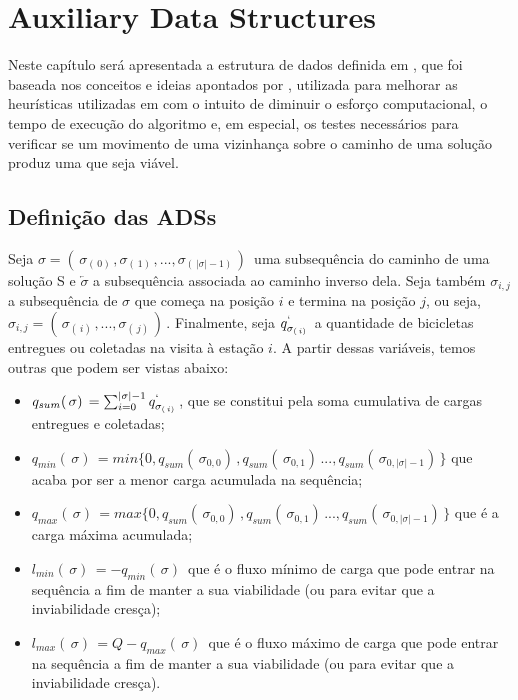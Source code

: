 \chapter{Auxiliary Data Structures}\label{chp:LABEL_CHP_4}
\par Neste capítulo será apresentada a estrutura de dados definida em \citet{art:REF_ART_4}, que foi baseada nos conceitos e ideias apontados por \citet{art:REF_ART_3}, utilizada para melhorar as heurísticas utilizadas em \citet{art:REF_ART_1} com o intuito de diminuir o esforço computacional, o tempo de execução do algoritmo e, em especial, os testes necessários para verificar se um movimento de uma vizinhança sobre o caminho de uma solução produz uma que seja viável.

\section{Definição das ADSs}\label{sec:LABEL_CHP_4_SEC_A}
\par Seja $\sigma = (\, \sigma_{(\,0)\,}, \sigma_{(\,1)\,}, ..., \sigma_{(\,|\sigma| - 1)\,})\,$ uma subsequência do caminho de uma solução S e $\overleftarrow{\sigma}$ a subsequência associada ao caminho inverso dela. Seja também $\sigma_{i, j}$ a subsequência de $\sigma$ que começa na posição $i$ e termina na posição $j$, ou seja, $\sigma_{i, j} = (\, \sigma_{(\,i)\,}, ..., \sigma_{(\,j)\,})\,$. Finalmente, seja $q^{\lq}_{\sigma_{(\,i)\,}}$ a quantidade de bicicletas entregues ou coletadas na visita à estação $i$. A partir dessas variáveis, temos outras que podem ser vistas abaixo:

    \begin{itemize}
        \item $q_{sum}(\,\sigma)\, = \sum^{|\sigma|-1}_{i=0}q^{\lq}_{\sigma_{(\,i)\,}}$, que se constitui pela soma cumulativa de cargas entregues e coletadas;
        \item $q_{min}(\,\sigma)\, = min\{0, q_{sum}(\,\sigma_{0, 0})\,, q_{sum}(\,\sigma_{0, 1})\, ..., q_{sum}(\,\sigma_{0, |\sigma|-1})\,\}$ que acaba por ser a menor carga acumulada na sequência;
        \item $q_{max}(\,\sigma)\, = max\{0, q_{sum}(\,\sigma_{0, 0})\,, q_{sum}(\,\sigma_{0, 1})\, ..., q_{sum}(\,\sigma_{0, |\sigma|-1})\,\}$ que é a carga máxima acumulada;
        \item $l_{min}(\,\sigma)\, = -q_{min}(\,\sigma)\,$ que é o fluxo mínimo de carga que pode entrar na sequência a fim de manter a sua viabilidade (ou para evitar que a inviabilidade cresça);
        \item $l_{max}(\,\sigma)\, = Q -q_{max}(\,\sigma)\,$ que é o fluxo máximo de carga que pode entrar na sequência a fim de manter a sua viabilidade (ou para evitar que a inviabilidade cresça).
    \end{itemize}
    

